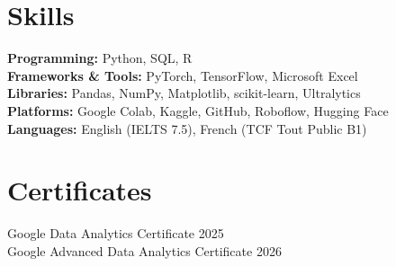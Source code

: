 \documentclass[11pt,a4paper]{article}
\begin{document}
\section*{Skills}
\textbf{Programming:} Python, SQL, R \\
\textbf{Frameworks \& Tools:} PyTorch, TensorFlow, Microsoft Excel \\
\textbf{Libraries:} Pandas, NumPy, Matplotlib, scikit-learn, Ultralytics \\
\textbf{Platforms:} Google Colab, Kaggle, GitHub, Roboflow, Hugging Face \\
\textbf{Languages:} English (IELTS 7.5), French (TCF Tout Public B1)

\section*{Certificates}
Google Data Analytics Certificate \hfill 2025 \\
Google Advanced Data Analytics Certificate \hfill 2026
\end{document}
